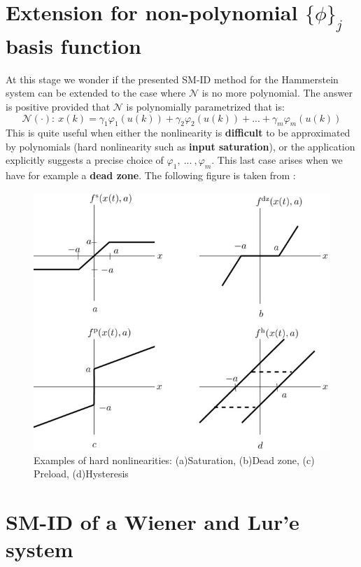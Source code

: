 \section{Extension for non-polynomial $\{\phi\}_j$ basis function}
At this stage we wonder if the presented SM-ID method for the Hammerstein system can be extended to the case where $\mathcal{N}$ is no more polynomial. The answer is positive provided that $\mathcal{N}$ is polynomially parametrized that is: 
\begin{equation}
    \mathcal{N}(\cdot): \ x(k)=\gamma_1{\varphi_1(u(k))}+\gamma_2{\varphi_2(u(k))}+...+\gamma_m{\varphi_m(u(k))}
\end{equation}
This is quite useful when either the nonlinearity is \textbf{difficult} to be approximated by polynomials (hard nonlinearity such as \textbf{input saturation}), or the application explicitly suggests a precise choice of $\varphi_1, \ ... \ , \varphi_m$. This last case arises when we have for example a \textbf{dead zone}.
The following figure is taken from \cite{pupeikis2003identification}: 
\begin{figure}[h]
    \centering
    \includegraphics[scale=1.2]{img/hardNL.jpg}
    \caption{Examples of hard nonlinearities: (a)Saturation, (b)Dead zone, (c) Preload, (d)Hysteresis}
\end{figure} 

\section{SM-ID of a Wiener and Lur'e system}
